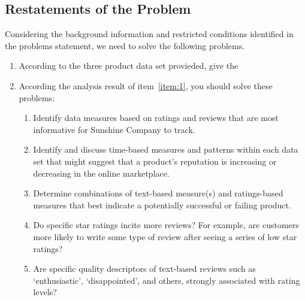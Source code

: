 \documentclass[../mcmpaper]{subfiles}
\begin{document}
    \subsection{Restatements of the Problem}
    Considering the background information and restricted conditions identified in the problems statement, we need to solve the following problems.
    \begin{enumerate}[topsep=0pt, itemsep=0pt]
        \item According to the three product data set provieded, give the \label{item:1}
        \item According the analysis result of item~\ref{item:1}, you should solve these problems:
        \begin{enumerate}[nosep, ref=\theenumi(\theenumii)]
            \item  Identify data measures based on ratings and reviews that are most informative for Sunshine Company to track.\label{a}
            \item Identify and discuss time-based measures and patterns within each data set that might suggest that a product’s reputation is increasing or decreasing in the online marketplace.\label{b}
            \item Determine combinations of text-based measure(s) and ratings-based measures that best indicate a potentially successful or failing product.\label{c}
            \item Do specific star ratings incite more reviews? For example, are customers more likely to write some type of review after seeing a series of low star ratings?\label{d}
            \item Are specific quality descriptors of text-based reviews such as `enthusiastic', `disappointed', and others, strongly associated with rating levels?\label{e}
        \end{enumerate}
    \end{enumerate}
\end{document}
